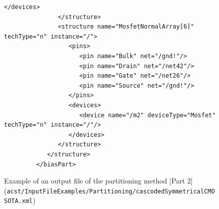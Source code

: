 \begin{figure}[H]
\begin{lstlisting}[basicstyle=\ttfamily\scriptsize,backgroundcolor={\color{gray!30}}, escapechar=? ]
                  </devices>
               </structure>
               <structure name="MosfetNormalArray[6]" techType="n" instance="/">
                  <pins>
                     <pin name="Bulk" net="/gnd!"/>
                     <pin name="Drain" net="/net42"/>
                     <pin name="Gate" net="/net26"/>
                     <pin name="Source" net="/gnd!"/>
                  </pins>
                  <devices>
                     <device name="/m2" deviceType="Mosfet" techType="n" instance="/"/>
                  </devices>
               </structure>
            </structure>
         </biasPart>
	\end{lstlisting}
	\caption{Example of an output file of the partitioning method [Part 2] ({\tt acst/InputFileExamples/Partitioning/cascodedSymmetricalCMOSOTA.xml})}
\end{figure}

